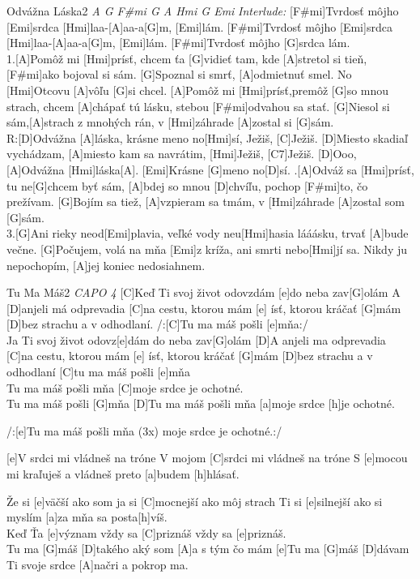 \documentclass[12pt]{article}
\begin{document}
\begin{song}{Odvážna Láska}{2}
	\textit{A G F\#mi G A Hmi G Emi}
	\textit{\color{gray}Interlude:}
	[F#mi]Tvrdosť môjho [Emi]srdca [Hmi]laa-[A]aa-a[G]m, [Emi]lám.
	[F#mi]Tvrdosť môjho [Emi]srdca [Hmi]laa-[A]aa-a[G]m, [Emi]lám.
	[F#mi]Tvrdosť môjho [G]srdca lám.
	\\
	1.[A]Pomôž mi [Hmi]prísť, chcem ťa [G]vidieť tam, 
	kde [A]stretol si tieň, [F#mi]ako bojoval si sám.
	[G]Spoznal si smrť, [A]odmietnuť smel.
	No [Hmi]Otcovu [A]vôľu [G]si chcel.
	[A]Pomôž mi [Hmi]prísť,premôž [G]so mnou strach, 
	chcem [A]chápať tú lásku, 
	stebou [F#mi]odvahou sa stať.
	[G]Niesol si sám,[A]strach z mnohých rán,
	v [Hmi]záhrade [A]zostal si [G]sám.
	\\
	R:[D]Odvážna [A]láska, 
	krásne meno no[Hmi]sí, Ježiš, [C]Ježiš.
	[D]Miesto skadiaľ vychádzam, 
	[A]miesto kam sa navrátim, [Hmi]Ježiš, [C7]Ježiš.	
	{\color{gray}[D]Ooo, [A]Odvážna [Hmi]láska[A]. [Emi]Krásne [G]meno no[D]sí.}
	.[A]Odváž sa [Hmi]prísť, tu ne[G]chcem byť sám,
	[A]bdej so mnou [D]chvíľu, pochop 
	[F#mi]to, čo prežívam.
	[G]Bojím sa tiež,
	[A]vzpieram sa tmám, 
	v [Hmi]záhrade [A]zostal som [G]sám.
	\\
	3.[G]Ani rieky neod[Emi]plavia, 
	veľké vody neu[Hmi]hasia lááásku,
	trvať [A]bude večne.
	[G]Počujem, volá na mňa [Emi]z kríža,
	ani smrti nebo[Hmi]jí sa.
	Nikdy ju nepochopím, 
	[A]jej koniec nedosiahnem.
\end{song}

\begin{song}{Tu Ma Máš}{2}
	\textit{CAPO 4}
	[C]Keď Ti svoj život odovzdám 
	[e]do neba zav[G]olám
	A [D]anjeli má odprevadia 
	[C]na cestu, ktorou mám [e] ísť,
	ktorou kráčať [G]mám
	[D]bez strachu a v odhodlaní.
	/:[C]Tu ma máš pošli [e]mňa:/
	\\
	[C]Ja Ti svoj život odovz[e]dám 
	do neba zav[G]olám
	[D]A anjeli ma odprevadia 
	[C]na cestu, ktorou mám [e] ísť,
	ktorou kráčať [G]mám
	[D]bez strachu a v odhodlaní
	[C]tu ma máš pošli [e]mňa
	\\
	[D]Tu ma máš pošli mňa
	[C]moje srdce je ochotné.
	\\
	[e]Tu ma máš pošli [G]mňa
	[D]Tu ma máš pošli mňa
	[a]moje srdce [h]je ochotné.
	
	/:[e]Tu ma máš pošli mňa (3x)
	moje srdce je ochotné.:/
	
	[e]V srdci mi vládneš na tróne
	V mojom [C]srdci mi vládneš na tróne
	S [e]mocou mi kraľuješ a vládneš 
	preto [a]budem [h]hlásať.
	
	Že si [e]väčší ako som ja
	si [C]mocnejší ako môj strach
	Ti si [e]silnejší ako si myslím 
	[a]za mňa sa posta[h]víš.
	\\
	Keď Ťa [e]význam 
	vždy sa [C]priznáš 
	vždy sa [e]priznáš.
	\\
	[e]Tu ma [G]máš 
	[D]takého aký som 
	[A]a s tým čo mám
	[e]Tu ma [G]máš 
	[D]dávam Ti svoje srdce
	[A]načri a pokrop ma.
\end{song}
\end{document}
